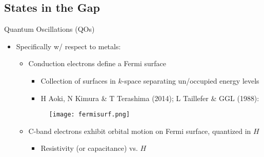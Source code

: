 \documentclass{beamer}
\begin{document}


\subsection{States in the Gap}







\begin{frame}[t]{Quantum Oscillations (QOs)}
  
    \begin{itemize}
        \item Specifically w/ respect to metals:     
        \begin{itemize}
            \item Conduction electrons define a Fermi surface 
            \begin{itemize}
                \item Collection of surfaces in $k$-space separating un/occupied energy levels
                
                \item H Aoki, N Kimura \& T Terashima (2014); L Taillefer \& GGL (1988):
            \end{itemize}
            
            \begin{figure}
            \centering
            \texttt{[image: fermisurf.png]}
            \label{fig:elecmuon}
            \end{figure}
    
            \item C-band electrons exhibit orbital motion on Fermi surface, quantized in $H$
            \begin{itemize}
                \item Resistivity (or capacitance) vs. $H$
            \end{itemize}
        \end{itemize}
        
    \end{itemize}

\end{frame}
\end{document}
